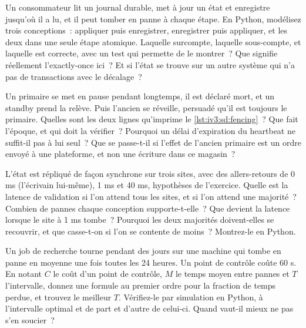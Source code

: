 \begin{question}\label{iq:iv3:system-design:32}
Un consommateur lit un journal durable, met à jour un état et enregistre jusqu'où il a lu, et il peut tomber en panne à chaque étape. En Python, modélisez trois conceptions~: appliquer puis enregistrer, enregistrer puis appliquer, et les deux dans une seule étape atomique. Laquelle surcompte, laquelle sous-compte, et laquelle est correcte, avec un test qui permette de le montrer~? Que signifie réellement l'exactly-once ici~? Et si l'état se trouve sur un autre système qui n'a pas de transactions avec le décalage~?
\end{question}

\begin{question}\label{iq:iv3:system-design:33}
Un primaire se met en pause pendant longtemps, il est déclaré mort, et un standby prend la relève. Puis l'ancien se réveille, persuadé qu'il est toujours le primaire. Quelles sont les deux lignes qu'imprime le \cref{lst:iv3:sd:fencing}~? Que fait l'époque, et qui doit la vérifier~? Pourquoi un délai d'expiration du heartbeat ne suffit-il pas à lui seul~? Que se passe-t-il si l'effet de l'ancien primaire est un ordre envoyé à une plateforme, et non une écriture dans ce magasin~?
\label{lst:iv3:sd:fencing}
\end{question}

\begin{question}\label{iq:iv3:system-design:34}
L'état est répliqué de façon synchrone sur trois sites, avec des allers-retours de 0 ms (l'écrivain lui-même), 1 ms et 40 ms, hypothèses de l'exercice. Quelle est la latence de validation si l'on attend tous les sites, et si l'on attend une majorité~? Combien de pannes chaque conception supporte-t-elle~? Que devient la latence lorsque le site à 1 ms tombe~? Pourquoi les deux majorités doivent-elles se recouvrir, et que casse-t-on si l'on se contente de moins~? Montrez-le en Python.
\end{question}

\begin{question}\label{iq:iv3:system-design:35}
Un job de recherche tourne pendant des jours sur une machine qui tombe en panne en moyenne une fois toutes les 24 heures. Un point de contrôle coûte 60 s. En notant $C$ le coût d'un point de contrôle, $M$ le temps moyen entre pannes et $T$ l'intervalle, donnez une formule au premier ordre pour la fraction de temps perdue, et trouvez le meilleur $T$. Vérifiez-le par simulation en Python, à l'intervalle optimal et de part et d'autre de celui-ci. Quand vaut-il mieux ne pas s'en soucier~?
\end{question}

